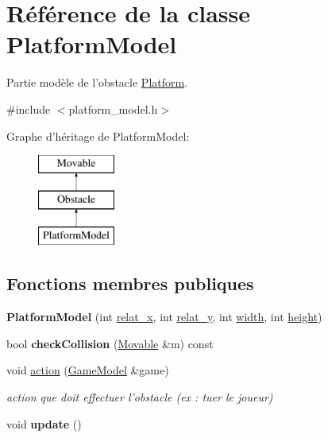 \hypertarget{class_platform_model}{\section{Référence de la classe Platform\+Model}
\label{class_platform_model}
}


Partie modèle de l'obstacle \hyperlink{class_platform}{Platform}.  




{\ttfamily \#include $<$platform\+\_\+model.\+h$>$}

Graphe d'héritage de Platform\+Model\+:\begin{figure}[H]
\begin{center}
\leavevmode
\includegraphics[height=3.000000cm]{class_platform_model}
\end{center}
\end{figure}
\subsection*{Fonctions membres publiques}
\begin{DoxyCompactItemize}
\item 
\hypertarget{class_platform_model_a576e47273119190cf58fc1594064bc96}{{\bfseries Platform\+Model} (int \hyperlink{class_obstacle_a37056563c8469b38aa240c7c423d7280}{relat\+\_\+x}, int \hyperlink{class_obstacle_a754f463db00e74fd5d66a758e4458c26}{relat\+\_\+y}, int \hyperlink{class_movable_a7e4607cccfcc96d2007c2e39c44cab54}{width}, int \hyperlink{class_movable_a192073065bc62d054f259c3b1522c09e}{height})}\label{class_platform_model_a576e47273119190cf58fc1594064bc96}

\item 
\hypertarget{class_platform_model_a1c71229c0656f06f03f65328c8a22716}{bool {\bfseries check\+Collision} (\hyperlink{class_movable}{Movable} \&m) const }\label{class_platform_model_a1c71229c0656f06f03f65328c8a22716}

\item 
\hypertarget{class_platform_model_a95e9ab3bac4c12820396eff9d8b03074}{void \hyperlink{class_platform_model_a95e9ab3bac4c12820396eff9d8b03074}{action} (\hyperlink{class_game_model}{Game\+Model} \&game)}\label{class_platform_model_a95e9ab3bac4c12820396eff9d8b03074}

\begin{DoxyCompactList}\small\item\em action que doit effectuer l'obstacle (ex \+: tuer le joueur) \end{DoxyCompactList}\item 
\hypertarget{class_platform_model_a6b423a254992c754a40e19efc577d364}{void {\bfseries update} ()}\label{class_platform_model_a6b423a254992c754a40e19efc577d364}

\end{DoxyCompactItemize}

